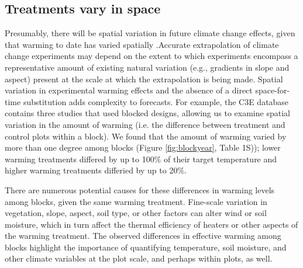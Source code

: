 \documentclass{article}
\begin{document}
\subsection* {Treatments vary in space}
Presumably, there will be spatial variation in future climate change effects, given that warming to date has varied spatially \citep{ipcc2013}.Accurate extrapolation of climate change experiments may depend on the extent to which experiments encompass a representative amount of existing natural variation (e.g., gradients in slope and aspect) present at the scale at which the extrapolation is being made. Spatial variation in experimental warming effects and the absence of a direct space-for-time substitution adds complexity to forecasts\citep{johnson2008,jochner2013}. For example, the C3E database contains three studies that used blocked designs, allowing us to examine spatial variation in the amount of warming (i.e. the difference between treatment and control plots within a block). We found that the amount of warming varied by more than one degree among blocks  (Figure \ref{fig:blockyear}, Table 1S)); lower warming treatments differed by up to 100\% of their target temperature and higher warming treatments differied by up to 20\%.
\par There are numerous potential causes for these differences in warming levels among blocks, given the same warming treatment. Fine-scale variation in vegetation, slope, aspect, soil type, or other factors can alter wind or soil moisture, which in turn affect the thermal efficiency of heaters or other aspects of the warming treatment\citep{peterjohn1993,kimball2005,kimball2008,hoeppner2012,rollinson2015}. The observed differences in effective warming among blocks highlight the importance of quantifying temperature, soil moisture, and other climate variables at the plot scale, and perhaps within plots, as well.  
\end{document}
